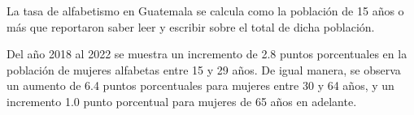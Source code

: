 La tasa de alfabetismo en Guatemala se calcula como la población de 15 años o más que reportaron saber leer y escribir sobre el total de dicha población.

Del año 2018 al 2022 se muestra un incremento de 2.8 puntos porcentuales en la población de mujeres alfabetas entre 15 y 29 años. De igual manera, se observa un aumento de 6.4 puntos porcentuales para mujeres entre 30 y 64 años, y un incremento 1.0 punto porcentual para mujeres de 65 años en adelante. 